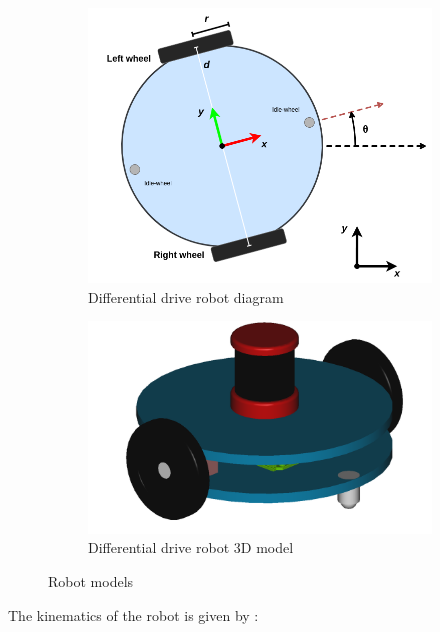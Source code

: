 \documentclass[../main.tex]{subfiles}
\begin{document}
\begin{figure}[H]
	\centering
	\begin{subfigure}{0.45\textwidth}
		\centering
		\includegraphics[width=\textwidth]{IMAGES/part5/robot_model_2.png}
		\caption{Differential drive robot diagram}
		\label{fig:robot_model}
	\end{subfigure}
	\hfill
	\begin{subfigure}{0.45\textwidth}
		\centering
		\includegraphics[width=\textwidth]{IMAGES/part5/robot_3Dmodel.png}
		\caption{Differential drive robot 3D model}
		\label{fig:robot_3Dmodel}
	\end{subfigure}
	\caption{Robot models}
\end{figure}

The kinematics of the robot is given by :
\end{document}
